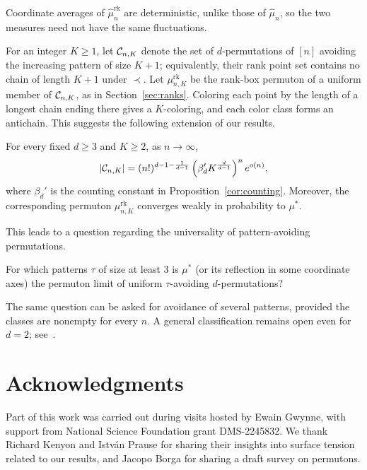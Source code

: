 \documentclass[11pt,letterpaper]{article}
\begin{document}
Coordinate averages of $\widehat\mu_n^{\mathrm{rk}}$ are deterministic, unlike those of $\widehat\mu_n$, so the two measures need not have the same fluctuations.

For an integer $K\ge1$, let $\mathcal C_{n,K}$ denote the set of $d$-permutations of $[n]$ avoiding the increasing pattern of size $K+1$; equivalently, their rank point set contains no chain of length $K+1$ under $\prec$. Let $\mu_{n,K}^{\mathrm{rk}}$ be the rank-box permuton of a uniform member of $\mathcal C_{n,K}$, as in Section~\ref{sec:ranks}. Coloring each point by the length of a longest chain ending there gives a $K$-coloring, and each color class forms an antichain. This suggests the following extension of our results.
\begin{conjecture}\label{conj:bounded-chains} For every fixed $d\ge3$ and $K\ge2$, as $n\to\infty$,
      \begin{equation}\label{eq:bounded-chains-counting}
            |\mathcal C_{n,K}|=(n!)^{d-1-\frac1{d-1}}
            \left(\beta_d' K^{\frac d{d-1}}\right)^n e^{o(n)},
      \end{equation}
      where $\beta_d'$ is the counting constant in Proposition~\ref{cor:counting}. Moreover, the corresponding permuton $\mu_{n,K}^{\mathrm{rk}}$ converges weakly in probability to $\mu^\ast$.
\end{conjecture}

This leads to a question regarding the universality of pattern-avoiding permutations.
\begin{question}\label{ques:universality} For which patterns $\tau$ of size at least $3$ is $\mu^\ast$ (or its reflection in some coordinate axes) the permuton limit of uniform $\tau$-avoiding $d$-permutations?
\end{question}
The same question can be asked for avoidance of several patterns, provided the classes are nonempty for every $n$. A general classification remains open even for $d=2$; see~\cite{hohmeier2025permuton}.


\section*{Acknowledgments}
Part of this work was carried out during visits hosted by Ewain Gwynne, with support from National Science Foundation grant DMS-2245832. We thank Richard Kenyon and Istv\'an Prause for sharing their insights into surface tension related to our results, and Jacopo Borga for sharing a draft survey on permutons.
\end{document}
